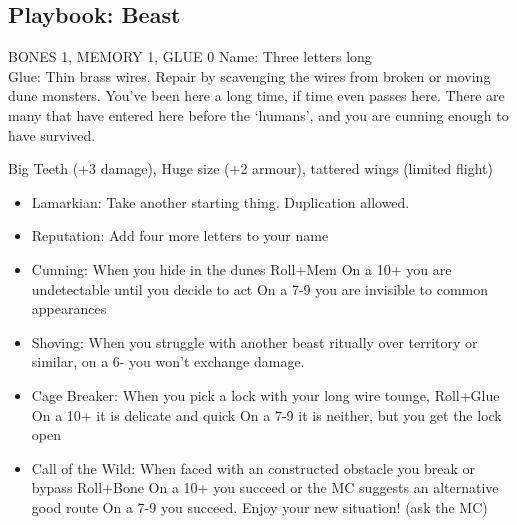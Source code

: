 \newpage
\subsection{Playbook: Beast}
BONES 1, MEMORY 1, GLUE 0  
Name: Three letters long
\\Glue: Thin brass wires. Repair by scavenging the wires from broken or moving dune monsters.
You've been here a long time, if time even passes here. There are many that have entered here before the `humans', and you are cunning enough to have survived.

 Big Teeth (+3 damage), Huge size (+2 armour), tattered wings (limited flight)
\begin{itemize}
\item  Lamarkian: Take another starting thing. Duplication allowed.
\item  Reputation: Add four more letters to your name
\item  Cunning: When you hide in the dunes Roll+Mem
\myitem On a 10+ you are undetectable until you decide to act
\myitemend On a 7-9 you are invisible to common appearances
\item  Shoving: When you struggle with another beast ritually over territory or similar, on a 6- you won't exchange damage.
\item  Cage Breaker: When you pick a lock with your long wire tounge, Roll+Glue
\myitem On a 10+ it is delicate and quick
\myitemend On a 7-9 it is neither, but you get the lock open
\item  Call of the Wild: When faced with an constructed obstacle you break or bypass Roll+Bone
\myitem On a 10+ you succeed or the MC suggests an alternative good route
\myitemend On a 7-9 you succeed. Enjoy your new situation! (ask the MC)
\end{itemize}


\newpage
